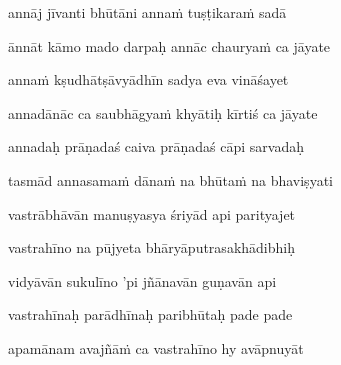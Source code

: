 annāj jīvanti bhūtāni annaṁ tuṣṭikaraṁ sadā\thinspace{\dandab} \dontdisplaylinenum

ānnāt kāmo mado darpaḥ annāc chauryaṁ ca jāyate \veg\dontdisplaylinenum
{}

annaṁ kṣudhātṣāvyādhīn sadya eva vināśayet\thinspace{\dandab} \dontdisplaylinenum

annadānāc ca saubhāgyaṁ khyātiḥ kīrtiś ca jāyate \veg\dontdisplaylinenum
{}

annadaḥ prāṇadaś caiva prāṇadaś cāpi sarvadaḥ\thinspace{\dandab} \dontdisplaylinenum

tasmād annasamaṁ dānaṁ na bhūtaṁ na bhaviṣyati \veg\dontdisplaylinenum



vastrābhāvān manuṣyasya śriyād api parityajet\thinspace{\dandab} \dontdisplaylinenum

vastrahīno na pūjyeta bhāryāputrasakhādibhiḥ \veg\dontdisplaylinenum
{}

vidyāvān sukulīno 'pi jñānavān guṇavān api\thinspace{\dandab} \dontdisplaylinenum

vastrahīnaḥ parādhīnaḥ paribhūtaḥ pade pade \veg\dontdisplaylinenum

apamānam avajñāṁ ca vastrahīno hy avāpnuyāt\thinspace{\dandab} \dontdisplaylinenum

